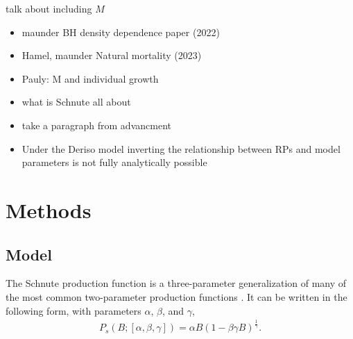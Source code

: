 {\color{red} talk about including $M$}


{\color{red}
\begin{itemize}
\item maunder BH density dependence paper (2022)
\item Hamel, maunder Natural mortality (2023)
\item Pauly: M and individual growth 

\item what is Schnute all about
\item take a paragraph from advancment
\item Under the Deriso model inverting the relationship between RPs and model parameters is not fully analytically possible \cite{schnute_analytical_1998}
\end{itemize}
}

%
\section{Methods \label{meth}}


%
\subsection{Model\label{sModel}}

%
The Schnute production function is a three-parameter generalization of many of
the most common two-parameter production functions \cite{deriso_harvesting_1980, schnute_general_1985}. %
It can be written in the following form, with parameters $\alpha$, $\beta$, and $\gamma$,
%
\begin{align}
P_s(B; [\alpha, \beta, \gamma]) = \alpha B (1-\beta\gamma B)^{\frac{1}{\gamma}}.
\end{align}

